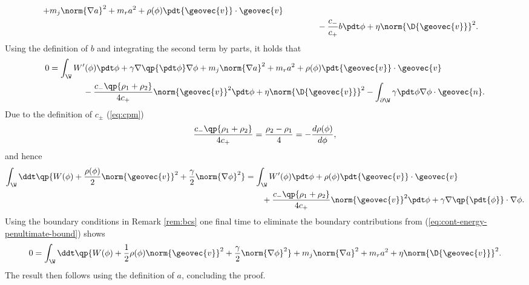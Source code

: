 \documentclass[final]{amsart}
\numberwithin{equation}{section}
\begin{document}
\begin{Proof}
\begin{equation}
\begin{split}
    +
    m_j \norm{\nabla a}^2
    +
    m_r a^2
    +
    \rho(\phi)
    \pdt{{\geovec{v}}} \cdot {\geovec{v}}
    \\
    &\qquad\qquad 
    -
    \frac{c_-}{c_+}
    b \pdt \phi
    +
    \eta \norm{\D {\geovec{v}}}^2     
    .
  \end{split}  
\end{equation}
Using the definition of $b$ and integrating the second term by parts,
it holds that
\begin{equation}
  \label{eq:cont-energy-penultimate-bound}
  \begin{split}
    0
    &=
    \int_\W
    W'(\phi)\pdt \phi
    +
    \gamma 
    \nabla \qp{\pdt \phi}
    \nabla \phi
    + 
    m_j \norm{\nabla a}^2
    +
    m_r a^2
    +
    \rho(\phi)
    \pdt{{\geovec{v}}} \cdot {\geovec{v}}
    \\
    &\qquad\qquad
    -
    \frac{c_-\qp{\rho_1+\rho_2}}{4c_+}
    \norm{{\geovec{v}}}^2 \pdt\phi
    +
    \eta \norm{\D {\geovec{v}}}^2     
    -
    \int_{\partial\W}
    \gamma \pdt \phi \nabla \phi \cdot {\geovec{n}}
    .
  \end{split}  
\end{equation}
Due to the definition of $c_\pm$ (\ref{eq:cpm})
\begin{equation}
  \frac{c_-\qp{\rho_1 + \rho_2}}{4c_+} 
  =
  \frac{\rho_2 - \rho_1}{4}
  =
  - \frac{d\rho(\phi)}{d\phi},
\end{equation}
and hence
\begin{equation}
  \begin{split}
    \int_\W
    \ddt 
    \qp{
      W(\phi) 
      +
      \frac{\rho(\phi)}{2}
      \norm{{\geovec{v}}}^2
      +
      \frac{\gamma}{2} \norm{\nabla \phi}^2
    }
    &=
    \int_\W
    W'(\phi)\pdt \phi
    +
    \rho(\phi) \pdt {{\geovec{v}}}\cdot {\geovec{v}}
    \\
    &\qquad+
    \frac{c_-\qp{\rho_1 + \rho_2}}{4c_+} 
    \norm{{\geovec{v}}}^2 \pdt \phi
    +
    \gamma \nabla\qp{\pdt{\phi}} \cdot \nabla \phi.
  \end{split}
\end{equation}
Using the boundary conditions in Remark \ref{rem:bcs} one final time
to eliminate the boundary contributions from
(\ref{eq:cont-energy-penultimate-bound}) shows
\begin{equation}
  0 
  =
  \int_\W
  \ddt 
  \qp{
    W(\phi) 
    +
    \frac{1}{2}
    \rho(\phi)
    \norm{{\geovec{v}}}^2
    +
    \frac{\gamma}{2} \norm{\nabla \phi}^2
  }
  +
  m_j \norm{\nabla a}^2
  +
  m_r a^2
  +
  \eta \norm{\D {\geovec{v}}}^2.  
\end{equation}
The result then follows using the definition of $a$, concluding the proof.
\end{Proof}
\end{document}

